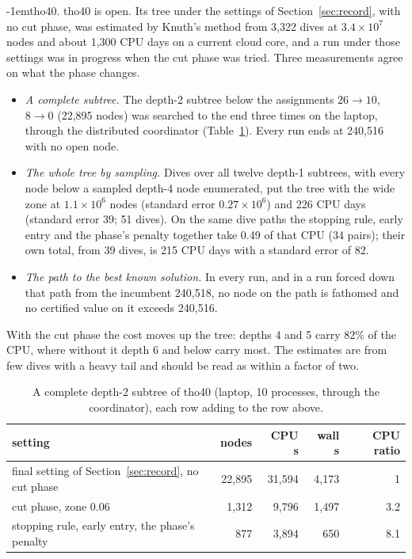 \documentclass[10pt]{article}
\makeatletter
\renewcommand\paragraph{\@startsection{paragraph}{4}{\z@}{2.5ex plus 1ex minus .2ex}%
  {-1em}{\normalfont\normalsize\bfseries}}
\theoremstyle{remark}
\makeatother
\begin{document}
\paragraph{tho40.} tho40 is open. Its tree under the settings of
Section~\ref{sec:record}, with no cut phase, was estimated by Knuth's method
\cite{knuth} from 3,322 dives at $3.4\times10^7$ nodes and about 1,300 CPU days on a
current cloud core, and a run under those settings was in progress when the cut
phase was tried. Three measurements agree on what the phase changes.
\begin{itemize}
\item \emph{A complete subtree.} The depth-2 subtree below the assignments
  $26\!\to\!10$, $8\!\to\!0$ (22,895 nodes) was searched to the end three times on the
  laptop, through the distributed coordinator (Table~\ref{tab:tho40cut}). Every run
  ends at 240,516 with no open node.
\item \emph{The whole tree by sampling.} Dives over all twelve depth-1 subtrees,
  with every node below a sampled depth-4 node enumerated, put the tree with the
  wide zone at $1.1\times10^6$ nodes (standard error $0.27\times10^6$) and 226 CPU
  days (standard error 39; 51 dives). On the same dive paths the stopping rule,
  early entry and the phase's penalty together take 0.49 of that CPU (34 pairs);
  their own total, from 39 dives, is 215 CPU days with a standard error of 82.
\item \emph{The path to the best known solution.} In every run, and in a run forced
  down that path from the incumbent 240,518, no node on the path is fathomed and no
  certified value on it exceeds 240,516.
\end{itemize}
With the cut phase the cost moves up the tree: depths 4 and 5 carry 82\% of the CPU,
where without it depth 6 and below carry most. The estimates are from few dives with
a heavy tail and should be read as within a factor of two.

\begin{table}[t]\centering
\caption{A complete depth-2 subtree of tho40 (laptop, 10 processes, through the
coordinator), each row adding to the row above.}\label{tab:tho40cut}
\small\setlength{\tabcolsep}{4pt}
\begin{tabular}{lrrrr}
\toprule
setting & nodes & CPU s & wall s & CPU ratio\\
\midrule
final setting of Section~\ref{sec:record}, no cut phase & 22,895 & 31,594 & 4,173 & 1\\
cut phase, zone 0.06 & 1,312 & 9,796 & 1,497 & 3.2\\
stopping rule, early entry, the phase's penalty & 877 & 3,894 & 650 & 8.1\\
\bottomrule
\end{tabular}
\end{table}
\end{document}
